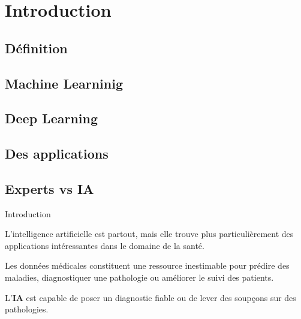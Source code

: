 \section{Introduction}
\subsection{\mybox Définition}
\subsection{\mybox Machine Learninig}
\subsection{\mybox Deep Learning}
\subsection{\mybox Des applications}
\subsection{\mybox Experts  vs IA}

\begin{frame}{Introduction}
    \begin{enumerate}[<+-|alert@+>]
        \myitem
        L'intelligence artificielle est partout, mais elle trouve plus 
        particulièrement des applications intéressantes dans le domaine
        de la santé.

        \myitem
        Les données médicales constituent une ressource inestimable pour prédire des maladies,
        diagnostiquer une pathologie ou améliorer le suivi des patients.

        \myitem
        L'\textbf{IA} est capable de poser un diagnostic fiable ou de lever des soupçons sur des
        pathologies.\mybox
    \end{enumerate}
\end{frame}




